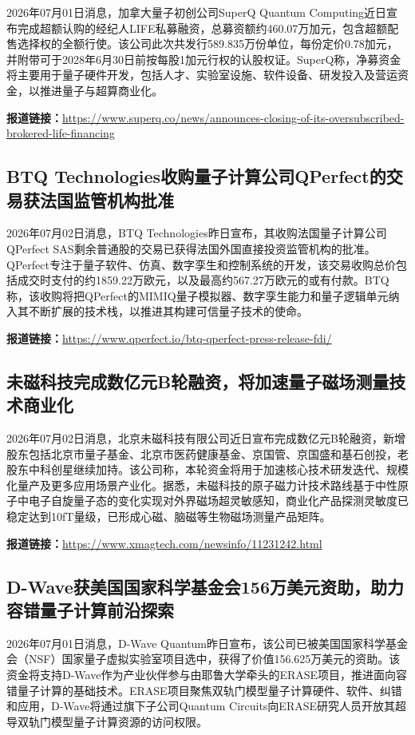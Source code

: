 \documentclass[12pt,a4paper]{ctexart}
\begin{document}
2026年07月01日消息，加拿大量子初创公司SuperQ Quantum Computing近日宣布完成超额认购的经纪人LIFE私募融资，总募资额约460.07万加元，包含超额配售选择权的全额行使。该公司此次共发行589.835万份单位，每份定价0.78加元，并附带可于2028年6月30日前按每股1加元行权的认股权证。SuperQ称，净募资金将主要用于量子硬件开发，包括人才、实验室设施、软件设备、研发投入及营运资金，以推进量子与超算商业化。

\noindent\textbf{报道链接：}\url{https://www.superq.co/news/announces-closing-of-its-oversubscribed-brokered-life-financing}

\subsection{ BTQ Technologies收购量子计算公司QPerfect的交易获法国监管机构批准 }

2026年07月02日消息，BTQ Technologies昨日宣布，其收购法国量子计算公司QPerfect SAS剩余普通股的交易已获得法国外国直接投资监管机构的批准。QPerfect专注于量子软件、仿真、数字孪生和控制系统的开发，该交易收购总价包括成交时支付的约1859.22万欧元，以及最高约567.27万欧元的或有付款。BTQ称，该收购将把QPerfect的MIMIQ量子模拟器、数字孪生能力和量子逻辑单元纳入其不断扩展的技术栈，以推进其构建可信量子技术的使命。

\noindent\textbf{报道链接：}\url{https://www.qperfect.io/btq-qperfect-press-release-fdi/}

\subsection{ 未磁科技完成数亿元B轮融资，将加速量子磁场测量技术商业化 }

2026年07月02日消息，北京未磁科技有限公司近日宣布完成数亿元B轮融资，新增股东包括北京市量子基金、北京市医药健康基金、京国管、京国盛和基石创投，老股东中科创星继续加持。该公司称，本轮资金将用于加速核心技术研发迭代、规模化量产及更多应用场景产业化。据悉，未磁科技的原子磁力计技术路线基于中性原子中电子自旋量子态的变化实现对外界磁场超灵敏感知，商业化产品探测灵敏度已稳定达到10fT量级，已形成心磁、脑磁等生物磁场测量产品矩阵。

\noindent\textbf{报道链接：}\url{https://www.xmagtech.com/newsinfo/11231242.html}

\subsection{ D-Wave获美国国家科学基金会156万美元资助，助力容错量子计算前沿探索 }

2026年07月01日消息，D-Wave Quantum昨日宣布，该公司已被美国国家科学基金会（NSF）国家量子虚拟实验室项目选中，获得了价值156.625万美元的资助。该资金将支持D-Wave作为产业伙伴参与由耶鲁大学牵头的ERASE项目，推进面向容错量子计算的基础技术。ERASE项目聚焦双轨门模型量子计算硬件、软件、纠错和应用，D-Wave将通过旗下子公司Quantum Circuits向ERASE研究人员开放其超导双轨门模型量子计算资源的访问权限。
\end{document}
